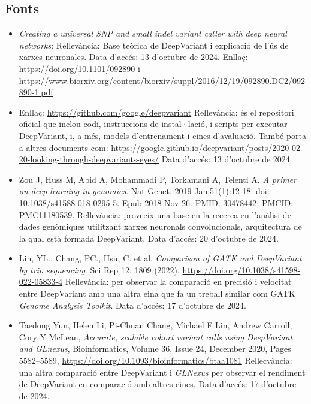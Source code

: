 \documentclass[a4paper]{article}
\begin{document}
\begin{table}[ht]
	\subsection{Fonts}
	\begin{itemize}
		\item \emph{Creating a universal SNP and small indel variant caller with deep neural networks}:
		Rellevància: Base teòrica de DeepVariant i explicació de l'ús de xarxes neuronales.
		Data d'accés: 13 d'octubre de 2024.
		Enllaç: \url{https://doi.org/10.1101/092890}
		i \url{https://www.biorxiv.org/content/biorxiv/suppl/2016/12/19/092890.DC2/092890-1.pdf}
		\item Enllaç: \url{https://github.com/google/deepvariant} Rellevància: és el repositori oficial que inclou codi, instruccions de instal·lació, i scripts per executar DeepVariant, i, a més, models d'entrenament i eines d'avaluació. També porta a altres documents com: \url{https://google.github.io/deepvariant/posts/2020-02-20-looking-through-deepvariants-eyes/} Data d'accés: 13 d'octubre de 2024.
		\item Zou J, Huss M, Abid A, Mohammadi P, Torkamani A, Telenti A. \emph{A primer on deep learning in genomics}. Nat Genet. 2019 Jan;51(1):12-18. doi: 10.1038/s41588-018-0295-5. Epub 2018 Nov 26. PMID: 30478442; PMCID: PMC11180539. Rellevància: proveeix una base en la recerca en l'anàlisi de dades genòmiques utilitzant xarxes neuronals convolucionals, arquitectura de la qual està formada DeepVariant. Data d'accés: 20 d'octubre de 2024.
		\item Lin, YL., Chang, PC., Hsu, C. et al. \textit{Comparison of GATK and DeepVariant by trio sequencing}. Sci Rep 12, 1809 (2022). \url{https://doi.org/10.1038/s41598-022-05833-4} Rellevància: per observar la comparació en precisió i velocitat entre DeepVariant amb una altra eina que fa un treball similar com GATK \textit{Genome Analysis Toolkit}. Data d'accés: 17 d'octubre de 2024.
		\item Taedong Yun, Helen Li, Pi-Chuan Chang, Michael F Lin, Andrew Carroll, Cory Y McLean, \textit{Accurate, scalable cohort variant calls using DeepVariant and GLnexus}, Bioinformatics, Volume 36, Issue 24, December 2020, Pages 5582–5589, \url{https://doi.org/10.1093/bioinformatics/btaa1081} Rellecvància: una altra comparació entre DeepVariant i \textit{GLNexus} per observar el rendiment de DeepVariant en comparació amb altres eines. Data d'accés: 17 d'octubre de 2024.
	\end{itemize}
		

\end{table}
\end{document}
